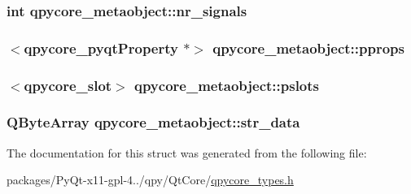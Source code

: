 \subsubsection[{nr\+\_\+signals}]{\setlength{\rightskip}{0pt plus 5cm}int qpycore\+\_\+metaobject\+::nr\+\_\+signals}\label{structqpycore__metaobject_aaf6c94a939685782919208c8dd1cba78}
\hypertarget{structqpycore__metaobject_ab7af032bdc563d7603aba3e8ca6b5f39}{}
\subsubsection[{pprops}]{$<${\bf qpycore\+\_\+pyqt\+Property} $\ast$$>$ qpycore\+\_\+metaobject\+::pprops}\label{structqpycore__metaobject_ab7af032bdc563d7603aba3e8ca6b5f39}
\hypertarget{structqpycore__metaobject_a8b4dd8cf4538d00159c124161ec6503f}{}
\subsubsection[{pslots}]{$<${\bf qpycore\+\_\+slot}$>$ qpycore\+\_\+metaobject\+::pslots}\label{structqpycore__metaobject_a8b4dd8cf4538d00159c124161ec6503f}
\hypertarget{structqpycore__metaobject_a388484a6b53b70bdb199d147f5864a40}{}
\subsubsection[{str\+\_\+data}]{\setlength{\rightskip}{0pt plus 5cm}Q\+Byte\+Array qpycore\+\_\+metaobject\+::str\+\_\+data}\label{structqpycore__metaobject_a388484a6b53b70bdb199d147f5864a40}


The documentation for this struct was generated from the following file\+:\begin{DoxyCompactItemize}
\item 
packages/\+Py\+Qt-\/x11-\/gpl-\/4../qpy/\+Qt\+Core/\hyperlink{qpycore__types_8h}{qpycore\+\_\+types.\+h}\end{DoxyCompactItemize}
